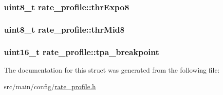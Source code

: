 \hypertarget{structrate__profile_ac6c992e999d312c139f378b3c5be7c09}{
\subsubsection[{thr\+Expo8}]{\setlength{\rightskip}{0pt plus 5cm}uint8\+\_\+t rate\+\_\+profile\+::thr\+Expo8}}\label{structrate__profile_ac6c992e999d312c139f378b3c5be7c09}
\hypertarget{structrate__profile_a1f8a754b6139ab81b9f641b968ddb1ce}{
\subsubsection[{thr\+Mid8}]{\setlength{\rightskip}{0pt plus 5cm}uint8\+\_\+t rate\+\_\+profile\+::thr\+Mid8}}\label{structrate__profile_a1f8a754b6139ab81b9f641b968ddb1ce}
\hypertarget{structrate__profile_af3f7ba8ebf4e5810704b0144917ed562}{
\subsubsection[{tpa\+\_\+breakpoint}]{\setlength{\rightskip}{0pt plus 5cm}uint16\+\_\+t rate\+\_\+profile\+::tpa\+\_\+breakpoint}}\label{structrate__profile_af3f7ba8ebf4e5810704b0144917ed562}


The documentation for this struct was generated from the following file\+:\begin{DoxyCompactItemize}
\item 
src/main/config/\hyperlink{config_2rate__profile_8h}{rate\+\_\+profile.\+h}\end{DoxyCompactItemize}
